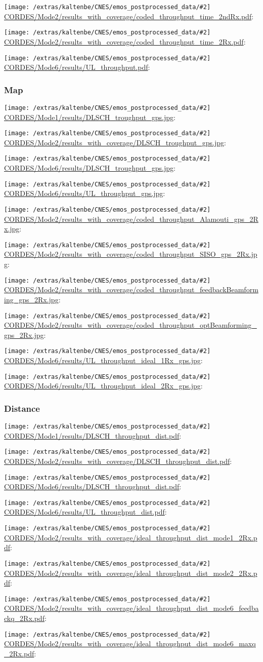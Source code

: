 \documentclass[a4paper,10pt]{article}
\newcommand{\printfile}[2][]{
 \begin{minipage}{8cm}
  \centering
  \texttt{[image: /extras/kaltenbe/CNES/emos\_postprocessed\_data/\#2]}
  \url{#2}: #1

 \end{minipage}
}
\begin{document}
\printfile{CORDES/Mode2/results_with_coverage/coded_throughput_time_2ndRx.pdf}
\printfile{CORDES/Mode2/results_with_coverage/coded_throughput_time_2Rx.pdf}

\printfile{CORDES/Mode6/results/UL_throughput.pdf}


\subsubsection{Map}

\printfile{CORDES/Mode1/results/DLSCH_troughput_gps.jpg}
\printfile{CORDES/Mode2/results_with_coverage/DLSCH_troughput_gps.jpg}

\printfile{CORDES/Mode6/results/DLSCH_troughput_gps.jpg}
\printfile{CORDES/Mode6/results/UL_throughput_gps.jpg}

\printfile{CORDES/Mode2/results_with_coverage/coded_throughput_Alamouti_gps_2Rx.jpg}
\printfile{CORDES/Mode2/results_with_coverage/coded_throughput_SISO_gps_2Rx.jpg}

\printfile{CORDES/Mode2/results_with_coverage/coded_throughput_feedbackBeamforming_gps_2Rx.jpg}
\printfile{CORDES/Mode2/results_with_coverage/coded_throughput_optBeamforming_gps_2Rx.jpg}

\printfile{CORDES/Mode6/results/UL_throughput_ideal_1Rx_gps.jpg}
\printfile{CORDES/Mode6/results/UL_throughput_ideal_2Rx_gps.jpg}

\subsubsection{Distance}

\printfile{CORDES/Mode1/results/DLSCH_throughput_dist.pdf}
\printfile{CORDES/Mode2/results_with_coverage/DLSCH_throughput_dist.pdf}

\printfile{CORDES/Mode6/results/DLSCH_throughput_dist.pdf}
\printfile{CORDES/Mode6/results/UL_throughput_dist.pdf}


\printfile{CORDES/Mode2/results_with_coverage/ideal_throughput_dist_mode1_2Rx.pdf}
%
\printfile{CORDES/Mode2/results_with_coverage/ideal_throughput_dist_mode2_2Rx.pdf}

\printfile{CORDES/Mode2/results_with_coverage/ideal_throughput_dist_mode6_feedbackq_2Rx.pdf}
%
\printfile{CORDES/Mode2/results_with_coverage/ideal_throughput_dist_mode6_maxq_2Rx.pdf}
\end{document}
